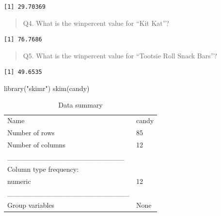 \documentclass[
  letterpaper,
  DIV=11,
  numbers=noendperiod]{scrartcl}
\newenvironment{Shaded}{\begin{snugshade}}{\end{snugshade}}
\newcommand{\FunctionTok}[1]{\textcolor[rgb]{0.28,0.35,0.67}{#1}}
\newcommand{\NormalTok}[1]{\textcolor[rgb]{0.00,0.23,0.31}{#1}}
\newcommand{\SpecialCharTok}[1]{\textcolor[rgb]{0.37,0.37,0.37}{#1}}
\newcommand{\StringTok}[1]{\textcolor[rgb]{0.13,0.47,0.30}{#1}}
\begin{document}
\begin{Shaded}
\end{Shaded}

\begin{verbatim}
[1] 29.70369
\end{verbatim}

\begin{quote}
Q4. What is the winpercent value for ``Kit Kat''?
\end{quote}

\begin{Shaded}
\end{Shaded}

\begin{verbatim}
[1] 76.7686
\end{verbatim}

\begin{quote}
Q5. What is the winpercent value for ``Tootsie Roll Snack Bars''?
\end{quote}

\begin{Shaded}
\end{Shaded}

\begin{verbatim}
[1] 49.6535
\end{verbatim}

\begin{Shaded}
\begin{Highlighting}[]
\FunctionTok{library}\NormalTok{(}\StringTok{"skimr"}\NormalTok{)}
\FunctionTok{skim}\NormalTok{(candy)}
\end{Highlighting}
\end{Shaded}

\begin{longtable}[]{@{}ll@{}}
\caption{Data summary}\tabularnewline
\toprule\noalign{}
\endfirsthead
\endhead
\bottomrule\noalign{}
\endlastfoot
Name & candy \\
Number of rows & 85 \\
Number of columns & 12 \\
\_\_\_\_\_\_\_\_\_\_\_\_\_\_\_\_\_\_\_\_\_\_\_ & \\
Column type frequency: & \\
numeric & 12 \\
\_\_\_\_\_\_\_\_\_\_\_\_\_\_\_\_\_\_\_\_\_\_\_\_ & \\
Group variables & None \\
\end{longtable}
\end{document}
